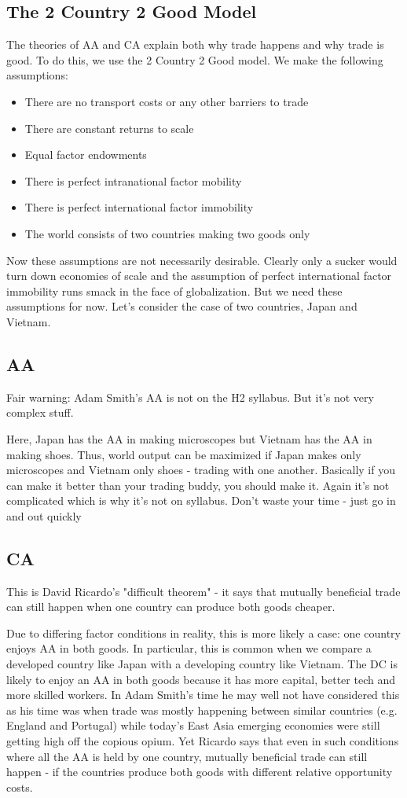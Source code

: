 \subsection{The 2 Country 2 Good Model}
The theories of AA and CA explain both why trade happens and why trade is good. To do this, we use the 2 Country 2 Good model. We make the following assumptions:
\begin{itemize}
\item There are no transport costs or any other barriers to trade
\item There are constant returns to scale
\item Equal factor endowments
\item There is perfect intranational factor mobility
\item There is perfect international factor immobility
\item The world consists of two countries making two goods only
\end{itemize}
Now these assumptions are not necessarily desirable. Clearly only a sucker would turn down economies of scale and the assumption of perfect international factor immobility runs smack in the face of globalization. But we need these assumptions for now. Let's consider the case of two countries, Japan and Vietnam.
\subsection{AA}
Fair warning: Adam Smith's AA is not on the H2 syllabus. But it's not very complex stuff.

Here, Japan has the AA in making microscopes but Vietnam has the AA in making shoes. Thus, world output can be maximized if Japan makes only microscopes and Vietnam only shoes - trading with one another. Basically if you can make it better than your trading buddy, you should make it. Again it's not complicated which is why it's not on syllabus. Don't waste your time - just go in and out quickly
\subsection{CA}
This is David Ricardo's "difficult theorem" - it says that mutually beneficial trade can still happen when one country can produce both goods cheaper.

Due to differing factor conditions in reality, this is more likely a case: one country enjoys AA in both goods. In particular, this is common when we compare a developed country like Japan with a developing country like Vietnam. The DC is likely to enjoy an AA in both goods because it has more capital, better tech and more skilled workers. In Adam Smith's time he may well not have considered this as his time was when trade was mostly happening between similar countries (e.g. England and Portugal) while today's East Asia emerging economies were still getting high off the copious opium. Yet Ricardo says that even in such conditions where all the AA is held by one country, mutually beneficial trade can still happen - if the countries produce both goods with different relative opportunity costs.

